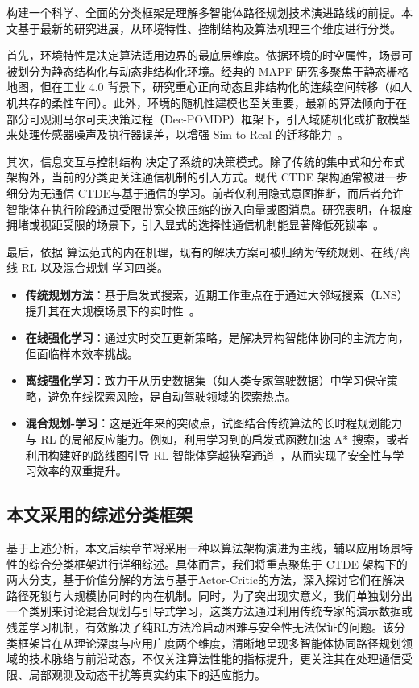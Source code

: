 \documentclass[13.5pt]{extarticle}
\begin{document}
构建一个科学、全面的分类框架是理解多智能体路径规划技术演进路线的前提。本文基于最新的研究进展，从环境特性、控制结构及算法机理三个维度进行分类。

首先，环境特性是决定算法适用边界的最底层维度。依据环境的时空属性，场景可被划分为静态结构化与动态非结构化环境。经典的 MAPF 研究多聚焦于静态栅格地图，但在工业 4.0 背景下，研究重心正向动态且非结构化的连续空间转移（如人机共存的柔性车间）。此外，环境的随机性建模也至关重要，最新的算法倾向于在部分可观测马尔可夫决策过程（Dec-POMDP）框架下，引入域随机化或扩散模型来处理传感器噪声及执行器误差，以增强 Sim-to-Real 的迁移能力~\cite{zhao2024sim2real}。

其次，信息交互与控制结构 决定了系统的决策模式。除了传统的集中式和分布式架构外，当前的分类更关注通信机制的引入方式。现代 CTDE 架构通常被进一步细分为无通信 CTDE与基于通信的学习。前者仅利用隐式意图推断，而后者允许智能体在执行阶段通过受限带宽交换压缩的嵌入向量或图消息。研究表明，在极度拥堵或视距受限的场景下，引入显式的选择性通信机制能显著降低死锁率~\cite{xiao2023multi}。

最后，依据 算法范式的内在机理，现有的解决方案可被归纳为传统规划、在线/离线 RL 以及混合规划-学习四类。
\begin{itemize}
    \item \textbf{传统规划方法}：基于启发式搜索，近期工作重点在于通过大邻域搜索（LNS）提升其在大规模场景下的实时性~\cite{li2023lacam, huang2023anytime}。
    \item \textbf{在线强化学习}：通过实时交互更新策略，是解决异构智能体协同的主流方向，但面临样本效率挑战。
    \item \textbf{离线强化学习}：致力于从历史数据集（如人类专家驾驶数据）中学习保守策略，避免在线探索风险，是自动驾驶领域的探索热点。
    \item \textbf{混合规划-学习}：这是近年来的突破点，试图结合传统算法的长时程规划能力与 RL 的局部反应能力。例如，利用学习到的启发式函数加速 A* 搜索，或者利用构建好的路线图引导 RL 智能体穿越狭窄通道~\cite{okumura2024ctr}，从而实现了安全性与学习效率的双重提升。
\end{itemize}

\subsection{本文采用的综述分类框架}

基于上述分析，本文后续章节将采用一种以算法架构演进为主线，辅以应用场景特性的综合分类框架进行详细综述。具体而言，我们将重点聚焦于 CTDE 架构下的两大分支，基于价值分解的方法与基于Actor-Critic的方法，深入探讨它们在解决路径死锁与大规模协同时的内在机制。同时，为了突出现实意义，我们单独划分出一个类别来讨论混合规划与引导式学习，这类方法通过利用传统专家的演示数据或残差学习机制，有效解决了纯RL方法冷启动困难与安全性无法保证的问题。该分类框架旨在从理论深度与应用广度两个维度，清晰地呈现多智能体协同路径规划领域的技术脉络与前沿动态，不仅关注算法性能的指标提升，更关注其在处理通信受限、局部观测及动态干扰等真实约束下的适应能力。
\end{document}
